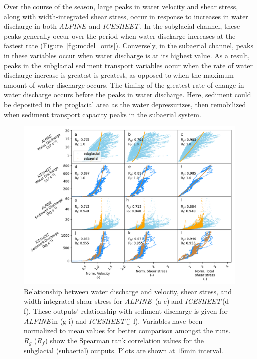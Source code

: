 \documentclass[11pt]{article}
\newcommand{\alpine}{\textit{ALPINE}\,}
\newcommand{\icesheet}{\textit{ICESHEET}\,}
\newcommand{\unit}[1]{$\mathrm{#1}$}
\begin{document}
Over the course of the season, large peaks in water velocity and shear stress, along with width-integrated shear stress, occur in response to increases in water discharge in both \alpine{} and \icesheet{}.
In the subglacial channel, these peaks generally occur over the period when water discharge increases at the fastest rate (Figure~\ref{fig:model_outs}).
Conversely, in the subaerial channel, peaks in these variables occur when water discharge is at its highest value.
As a result, peaks in the subglacial sediment transport variables occur  when the rate of water discharge increase is greatest
is greatest, as opposed to when the maximum amount of water discharge occurs.
The timing of the greatest rate of change in water discharge occurs before the peaks in water discharge. 
Here, sediment could be deposited in the proglacial area as the water depressurizes, then remobilized when sediment transport capacity peaks in the subaerial system.

\begin{figure}[h]
  \centering
  \includegraphics[width=0.9\linewidth]{Fig3.png}
  \caption{Relationship between water discharge and velocity, shear stress, and width-integrated shear stress for \alpine{} (a-c) and \icesheet (d-f).
    These outputs' relationship with sediment discharge is given for \alpine in (g-i) and \icesheet (j-l).
    Variables have been normalized to mean values for better comparison amongst the runs.
    $R_g$ ($R_f$) show the Spearman rank correlation values for the subglacial (subaerial) outputs.
    Plots are shown at $15$\unit{min} interval.
  } 
  \label{fig:Qw_vari}
\end{figure}
\end{document}
